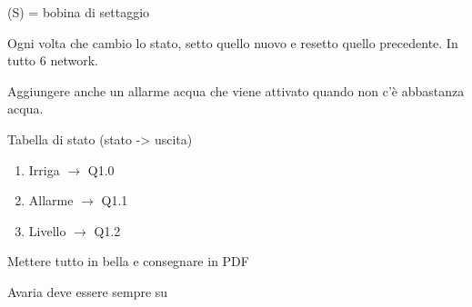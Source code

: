 \documentclass{article}
\begin{document}
    (S) = bobina di settaggio

    Ogni volta che cambio lo stato, setto quello nuovo e resetto quello precedente.
    In tutto 6 network.

    Aggiungere anche un allarme acqua che viene attivato quando non c'è abbastanza acqua.

    Tabella di stato (stato -> uscita)
    \begin{enumerate}
        \item Irriga $\rightarrow$ Q1.0
        \item Allarme $\rightarrow$ Q1.1
        \item Livello $\rightarrow$ Q1.2
    \end{enumerate}

    Mettere tutto in bella e consegnare in PDF

    Avaria deve essere sempre su
\end{document}
